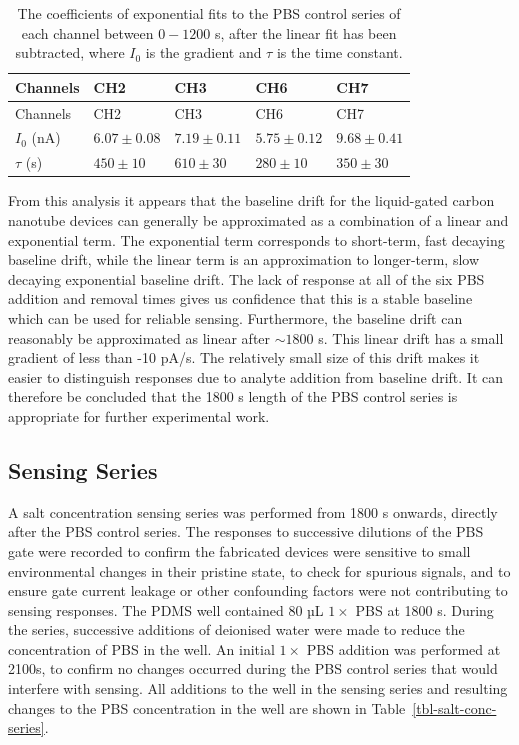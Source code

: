 \documentclass[
  a4paper,
]{scrbook}
\begin{document}
\hypertarget{tbl-exp-fits}{}
\begin{longtable}[]{@{}lllll@{}}
\caption{\label{tbl-exp-fits}The coefficients of exponential fits to the
PBS control series of each channel between \(0-1200\) s, after the
linear fit has been subtracted, where \(I_0\) is the gradient and
\(\tau\) is the time constant.\\
}\tabularnewline
\toprule\noalign{}
Channels & CH2 & CH3 & CH6 & CH7 \\
\midrule\noalign{}
\endfirsthead
\toprule\noalign{}
Channels & CH2 & CH3 & CH6 & CH7 \\
\midrule\noalign{}
\endhead
\bottomrule\noalign{}
\endlastfoot
\(I_0\) (nA) & \(6.07\pm0.08\) & \(7.19\pm0.11\) & \(5.75\pm0.12\) &
\(9.68\pm0.41\) \\
\(\tau\) (s) & \(450\pm10\) & \(610\pm30\) & \(280\pm10\) &
\(350\pm30\) \\
\end{longtable}

From this analysis it appears that the baseline drift for the
liquid-gated carbon nanotube devices can generally be approximated as a
combination of a linear and exponential term. The exponential term
corresponds to short-term, fast decaying baseline drift, while the
linear term is an approximation to longer-term, slow decaying
exponential baseline drift. The lack of response at all of the six PBS
addition and removal times gives us confidence that this is a stable
baseline which can be used for reliable sensing. Furthermore, the
baseline drift can reasonably be approximated as linear after
\(\sim 1800\) s. This linear drift has a small gradient of less than -10
pA/s. The relatively small size of this drift makes it easier to
distinguish responses due to analyte addition from baseline drift. It
can therefore be concluded that the 1800 s length of the PBS control
series is appropriate for further experimental work.

\hypertarget{sec-salt-conc-series}{%
\subsection{Sensing Series}\label{sec-salt-conc-series}}

A salt concentration sensing series was performed from 1800 s onwards,
directly after the PBS control series. The responses to successive
dilutions of the PBS gate were recorded to confirm the fabricated
devices were sensitive to small environmental changes in their pristine
state, to check for spurious signals, and to ensure gate current leakage
or other confounding factors were not contributing to sensing responses.
The PDMS well contained 80 µL \(1 \times\) PBS at 1800 s. During the
series, successive additions of deionised water were made to reduce the
concentration of PBS in the well. An initial \(1 \times\) PBS addition
was performed at 2100s, to confirm no changes occurred during the PBS
control series that would interfere with sensing. All additions to the
well in the sensing series and resulting changes to the PBS
concentration in the well are shown in Table~\ref{tbl-salt-conc-series}.
\end{document}
